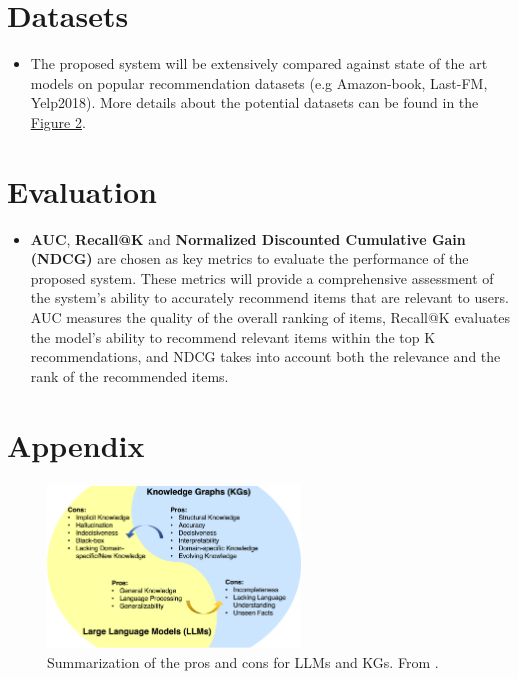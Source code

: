 \documentclass[a4paper]{article}
\begin{document}
\section*{Datasets}
\begin{itemize}
\item The proposed system will be extensively compared against state of the art models on popular recommendation datasets (e.g Amazon-book, Last-FM, Yelp2018). More details about the potential datasets can be found in the \hyperref[fig:datasets]{Figure 2}.
\end{itemize}
\section*{Evaluation}
\begin{itemize}
\item \textbf{AUC}, \textbf{Recall@K} and \textbf{Normalized Discounted Cumulative Gain (NDCG)} are chosen as key metrics to evaluate the performance of the proposed system. 
These metrics will provide a comprehensive assessment of the system's ability to accurately recommend items that are relevant to users. 
AUC measures the quality of the overall ranking of items, Recall@K evaluates the model's ability to recommend relevant items within the top K recommendations, and NDCG takes into account both the relevance and the rank of the recommended items.
\end{itemize}

\nocite{*}



\section*{Appendix}

\begin{figure}[H]
\centering
\includegraphics[width=0.6\textwidth]{PLM_vs_KG.png}
\caption{Summarization of the pros and cons for LLMs and KGs. From \cite{pan2023unifying}.}
\label{fig:llm_vs_kg}
\end{figure}
\end{document}
